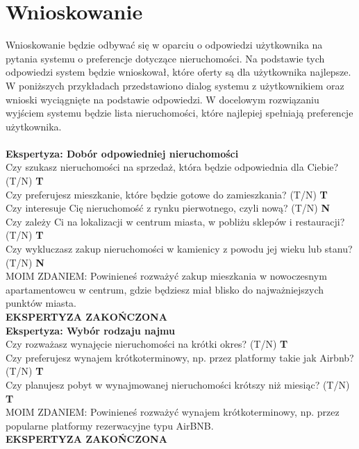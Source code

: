 \section{Wnioskowanie}
Wnioskowanie będzie odbywać się w oparciu o odpowiedzi użytkownika na pytania systemu o preferencje dotyczące nieruchomości. Na podstawie tych odpowiedzi system będzie wnioskował, które oferty są dla użytkownika najlepsze. W poniższych przykładach przedstawiono dialog systemu z użytkownikiem oraz wnioski wyciągnięte na podstawie odpowiedzi. W docelowym rozwiązaniu wyjściem systemu będzie lista nieruchomości, które najlepiej spełniają preferencje użytkownika.
\\ \\
\noindent \textbf{Ekspertyza: Dobór odpowiedniej nieruchomości}\\
\noindent Czy szukasz nieruchomości na sprzedaż, która będzie odpowiednia dla Ciebie? (T/N) \textbf{T} \\
\noindent Czy preferujesz mieszkanie, które będzie gotowe do zamieszkania? (T/N) \textbf{T} \\
\noindent Czy interesuje Cię nieruchomość z rynku pierwotnego, czyli nową? (T/N) \textbf{N} \\
\noindent Czy zależy Ci na lokalizacji w centrum miasta, w pobliżu sklepów i restauracji? (T/N) \textbf{T} \\
\noindent Czy wykluczasz zakup nieruchomości w kamienicy z powodu jej wieku lub stanu? (T/N) \textbf{N} \\
MOIM ZDANIEM: Powinieneś rozważyć zakup mieszkania w nowoczesnym apartamentowcu w centrum, gdzie będziesz miał blisko do najważniejszych punktów miasta.\\
\textbf{EKSPERTYZA ZAKOŃCZONA}\\

\noindent \textbf{Ekspertyza: Wybór rodzaju najmu}\\
\noindent Czy rozważasz wynajęcie nieruchomości na krótki okres? (T/N) \textbf{T} \\
\noindent Czy preferujesz wynajem krótkoterminowy, np. przez platformy takie jak Airbnb? (T/N) \textbf{T} \\
\noindent Czy planujesz pobyt w wynajmowanej nieruchomości krótszy niż miesiąc? (T/N) \textbf{T} \\
MOIM ZDANIEM: Powinieneś rozważyć wynajem krótkoterminowy, np. przez popularne platformy rezerwacyjne typu AirBNB.\\
\textbf{EKSPERTYZA ZAKOŃCZONA}\\


